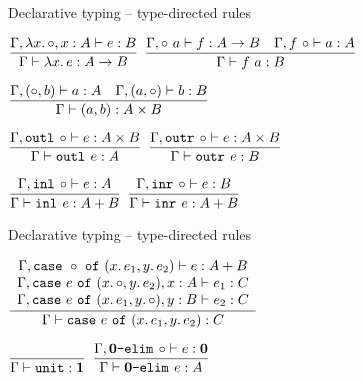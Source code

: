 \documentclass{beamer}
\begin{document}
\begin{frame}{Declarative typing -- type-directed rules}

\begin{center}
  $\infrule{\typing[\extendfun{\Gamma}{x}{A}]{e}{B}}{\typing{\fun{x}{e}}{\Fun{A}{B}}}$ \quad
  $\infrule{\typing[\extendappl{\Gamma}{a}]{f}{\Fun{A}{B}} \quad \typing[\extendappr{\Gamma}{f}]{a}{A}}{\typing{\app{f}{a}}{B}}$

  \vspace{2em}

  $\infrule{\typing[\extendpairl{\Gamma}{b}]{a}{A} \quad \typing[\extendpairr{\Gamma}{a}]{b}{B}}{\typing{\pair{a}{b}}{\Prod{A}{B}}}$

  \vspace{2em}

  $\infrule{\typing[\extendoutl{\Gamma}]{e}{\Prod{A}{B}}}{\typing{\outl{e}}{A}}$ \quad
  $\infrule{\typing[\extendoutr{\Gamma}]{e}{\Prod{A}{B}}}{\typing{\outr{e}}{B}}$

  \vspace{2em}

  $\infrule{\typing[\extendinl{\Gamma}]{e}{A}}{\typing{\inl{e}}{\Sum{A}{B}}}$ \quad
  $\infrule{\typing[\extendinr{\Gamma}]{e}{B}}{\typing{\inr{e}}{\Sum{A}{B}}}$
\end{center}

\end{frame}

\begin{frame}{Declarative typing -- type-directed rules}

\begin{center}
  $\infrule{\begin{array}{c} \typing[\extendcasearg{\Gamma}{x.\, e_1}{y.\, e_2}]{e}{\Sum{A}{B}} \\ \typing[\extendcasel{\Gamma}{e}{x}{A}{y.\, e_2}]{e_1}{C} \\ \typing[\extendcaser{\Gamma}{e}{x.\, e_1}{y}{B}]{e_2}{C} \end{array}}{\typing{\case{e}{x.\, e_1}{y.\, e_2}}{C}}$

  \vspace{2em}

  $\infrule{}{\typing{\unit}{\Unit}}$ \quad
  $\infrule{\typing[\extendemptyelim{\Gamma}]{e}{\Empty}}{\typing{\emptyelim{e}}{A}}$
\end{center}

\end{frame}
\end{document}
